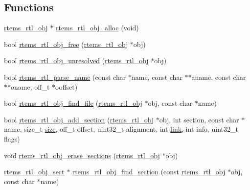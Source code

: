 \subsection*{Functions}
\begin{DoxyCompactItemize}
\item 
\mbox{\hyperlink{structrtems__rtl__obj}{rtems\+\_\+rtl\+\_\+obj}} $\ast$ \mbox{\hyperlink{rtl-obj_8h_a680decdef583cdfa336e9adc86c71e87}{rtems\+\_\+rtl\+\_\+obj\+\_\+alloc}} (void)
\item 
bool \mbox{\hyperlink{rtl-obj_8h_a7385d2d95fc68a554aac41f11fb2248d}{rtems\+\_\+rtl\+\_\+obj\+\_\+free}} (\mbox{\hyperlink{structrtems__rtl__obj}{rtems\+\_\+rtl\+\_\+obj}} $\ast$obj)
\item 
bool \mbox{\hyperlink{rtl-obj_8h_a63170089dcc2fbe5453fe01659c99616}{rtems\+\_\+rtl\+\_\+obj\+\_\+unresolved}} (\mbox{\hyperlink{structrtems__rtl__obj}{rtems\+\_\+rtl\+\_\+obj}} $\ast$obj)
\item 
bool \mbox{\hyperlink{rtl-obj_8h_a783aed59695cd068d8cb244655fdca76}{rtems\+\_\+rtl\+\_\+parse\+\_\+name}} (const char $\ast$name, const char $\ast$$\ast$aname, const char $\ast$$\ast$oname, off\+\_\+t $\ast$ooffset)
\item 
bool \mbox{\hyperlink{rtl-obj_8h_a01178159b33ae5e8a94b77f5f2fd6aa9}{rtems\+\_\+rtl\+\_\+obj\+\_\+find\+\_\+file}} (\mbox{\hyperlink{structrtems__rtl__obj}{rtems\+\_\+rtl\+\_\+obj}} $\ast$obj, const char $\ast$name)
\item 
bool \mbox{\hyperlink{rtl-obj_8h_a08fe8380ba12aee966bd18675becf6cd}{rtems\+\_\+rtl\+\_\+obj\+\_\+add\+\_\+section}} (\mbox{\hyperlink{structrtems__rtl__obj}{rtems\+\_\+rtl\+\_\+obj}} $\ast$obj, int section, const char $\ast$name, size\+\_\+t \mbox{\hyperlink{sun4u_2tte_8h_a245260f6f74972558f61b85227df5aae}{size}}, off\+\_\+t offset, uint32\+\_\+t alignment, int \mbox{\hyperlink{link_8c_a8c94afd0b7e5bb4ce95fefd964241f7f}{link}}, int info, uint32\+\_\+t flags)
\item 
void \mbox{\hyperlink{rtl-obj_8h_a35b64d2ab1e6c8fa1a82dfa0a14ea1e0}{rtems\+\_\+rtl\+\_\+obj\+\_\+erase\+\_\+sections}} (\mbox{\hyperlink{structrtems__rtl__obj}{rtems\+\_\+rtl\+\_\+obj}} $\ast$obj)
\item 
\mbox{\hyperlink{structrtems__rtl__obj__sect}{rtems\+\_\+rtl\+\_\+obj\+\_\+sect}} $\ast$ \mbox{\hyperlink{rtl-obj_8h_ace58c2df49449c7973236afeb1365c9c}{rtems\+\_\+rtl\+\_\+obj\+\_\+find\+\_\+section}} (const \mbox{\hyperlink{structrtems__rtl__obj}{rtems\+\_\+rtl\+\_\+obj}} $\ast$obj, const char $\ast$name)
\item 

\end{DoxyCompactItemize}
